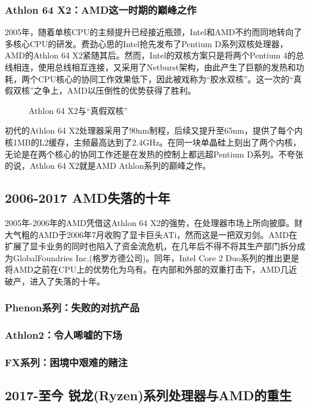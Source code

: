\documentclass[UTF8]{ctexart}
\begin{document}
\subsubsection{Athlon 64 X2：AMD这一时期的巅峰之作}
2005年，随着单核CPU的主频提升已经接近瓶颈，Intel和AMD不约而同地转向了多核心CPU的研发。费劲心思的Intel抢先发布了Pentium D系列双核处理器，AMD的Athlon 64 X2紧随其后。然而，Intel的双核方案只是将两个Pentium 4的总线相连，使用总线相互连接，又采用了Netburst架构，由此产生了巨额的发热和功耗，两个CPU核心的协同工作效果低下，因此被戏称为“胶水双核”。这一次的“真假双核”之争上，AMD以压倒性的优势获得了胜利。
\begin{figure}[H]
    \centering
    \caption{Athlon 64 X2与“真假双核”}
\end{figure}

初代的Athlon 64 X2处理器采用了90nm制程，后续又提升至65nm，提供了每个内核1MB的L2缓存，主频最高达到了2.4GHz。在同一块单晶硅上刻出了两个内核，无论是在两个核心的协同工作还是在发热的控制上都远超Pentium D系列。不夸张的说，Athlon 64 X2就是AMD Athlon系列的巅峰之作。

\subsection{2006-2017 AMD失落的十年}
2005年-2006年的AMD凭借这Athlon 64 X2的强势，在处理器市场上所向披靡。财大气粗的AMD于2006年7月收购了显卡巨头ATi，然而这是一把双刃剑。AMD在扩展了显卡业务的同时也陷入了资金流危机，在几年后不得不将其生产部门拆分成为GlobalFoundries Inc.(格罗方德公司)。同年，Intel Core 2 Duo系列的推出更是将AMD之前在CPU上的优势化为乌有。在内部和外部的双重打击下，AMD几近破产，进入了失落的十年。

\subsubsection{Phenon系列：失败的对抗产品}
\subsubsection{Athlon2：令人唏嘘的下场}
\subsubsection{FX系列：困境中艰难的赌注}

\subsection{2017-至今 锐龙(Ryzen)系列处理器与AMD的重生}
\end{document}
